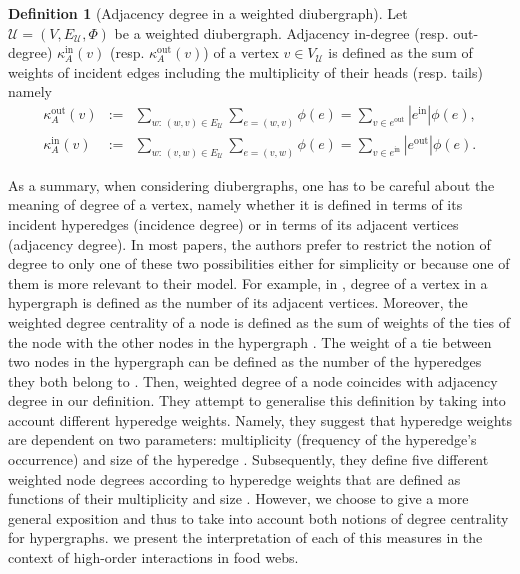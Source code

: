 \documentclass[a4paper,12pt]{article}
\theoremstyle{definition}
\newtheorem{definition}{Definition}%
\theoremstyle{remark}
\newcommand{\aadd}[2][]{\added[id=Alex,comment=#1]{#2}}
\newcommand{\mU}{\mathcal{U}}
\newcommand{\tin}{\mathrm{in}} %
\newcommand{\out}{\mathrm{out}}
\begin{document}
\begin{definition}[Adjacency degree in a weighted diubergraph]\label{def:adj_deg}
     Let $\mathcal{U}=(V,E_{\mathcal{U}},\Phi)$ be a weighted diubergraph. Adjacency in-degree (resp. out-degree) $ \kappa_{A}^{\tin}(v)$ (resp. $ \kappa_{A}^{\out}(v)$) of a vertex $v \in V_{\mU}$ is defined as the sum of weights of incident edges including the multiplicity of their heads (resp. tails) namely 
    \begin{eqnarray*}
        \kappa_{A}^{\out}(v)&:=&\sum_{w:\,(w,v)\in E_{\mU}} \sum_{e=(w,v)} \phi(e)=
        \sum_{v \in e^{\mathrm{\out}} } |e^{\mathrm{\tin}}|\phi(e), \\ \kappa_{A}^{\tin}(v)&:=&\sum_{w:\,(v,w)\in E_{\mU}} \sum_{e=(v,w)} \phi(e)=\sum_{v \in e^{\mathrm{\tin}}}|e^{\out}|\phi(e).
    \end{eqnarray*}
\end{definition}

As a summary, when considering diubergraphs, one has to be careful about the meaning of degree of a vertex, namely whether it is defined in terms of its incident hyperedges (incidence degree) or in terms of its adjacent vertices (adjacency degree). In most papers, the authors prefer to restrict the notion of degree to only one of these two possibilities either for simplicity or because one of them is more relevant to their model. For example, in \cite{Kapoor2013}, degree of a vertex in a hypergraph is defined as the number of its adjacent vertices. Moreover, the weighted degree centrality of a node is defined as the sum of weights of the ties of the node with the other nodes in the hypergraph \cite{Kapoor2013}. The weight of a tie between two nodes in the hypergraph can be defined as the number of the hyperedges they both belong to \cite{Kapoor2013}. Then, weighted degree of a node coincides with adjacency degree in our definition. They attempt to generalise this definition by taking into account different hyperedge weights. Namely, they suggest that hyperedge weights are dependent on two parameters: multiplicity (frequency of the hyperedge’s occurrence) and size of the hyperedge \cite{Kapoor2013}. Subsequently, they define five different weighted node degrees according to hyperedge weights that are defined as functions of their multiplicity and size \cite{Kapoor2013}. However, we choose to give a more general exposition and thus to take into account both notions of degree centrality for hypergraphs. \aadd{In Section \ref{sec:real_exam}} we present the interpretation of each of this measures in the context of high-order interactions in food webs.
\end{document}
